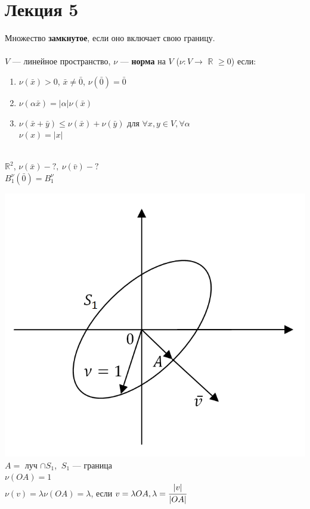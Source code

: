 \documentclass[12pt]{article}
\theoremstyle{definition}
\numberwithin{equation}{section}
\begin{document}
\section *{Лекция 5}
\noindent Множество \textbf{замкнутое}, если оно включает свою границу.\\ \\
$V$ --- линейное пространство, $\nu$ --- \textbf{норма} на $V$ ($\nu : V \to$ $\mathbb{R}$ $\geqslant 0$) если:\begin{enumerate}
\item $\nu(\bar x) > 0$, $\bar x \neq \bar 0$, $\nu(\bar 0) = \bar 0$
\item $\nu(\alpha \bar x) = |\alpha|\nu(\bar x)$
\item $\nu(\bar x + \bar y) \leq \nu(\bar x) + \nu(\bar y)$ для $\forall x, y \in V, \forall \alpha$\\
$\nu (x) = |x|$\end{enumerate}
~\\
$\mathbb{R}^2$, $\nu(\bar x) - ?,~ \nu(\bar v ) - ?$\\
$B_1^{\nu}(\bar 0) = B_1^{\nu}$\begin{center}\includegraphics[scale=0.6]{l5_2.png}\\
$A = $ луч $ \cap S_1$, $~S_1$ --- граница\\
$\nu(OA) = 1$\\
$\nu(v) = \lambda \nu(OA) = \lambda$, если $v = \lambda OA, \lambda = \cfrac{|v|}{|OA|}$
\end{center}
\end{document}
